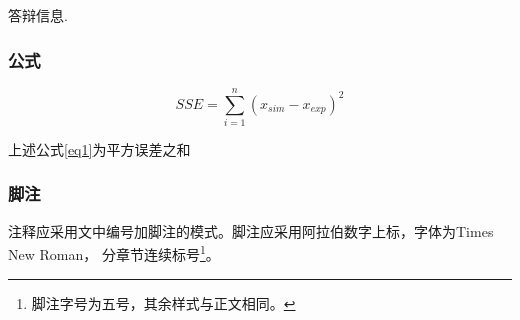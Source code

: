 \begin{center}
    \begin{table}[!htp]
        \vspace{-2em}
        \caption{答辩信息.}
        \vspace{-1.5em}
        \addtocounter{table}{-1}
        \renewcommand{\tablename}{Table.}    
        \caption{the title of the Table.} 
        \vspace*{-1em}
        \song{}
    \end{table}  
\end{center}

\newpage

\subsubsection{公式}

\begin{equation}
    SSE=\sum^{n}_{i=1}(x_{sim}-x_{exp})^2 \label{eq1}
\end{equation}

上述公式\ref{eq1}为平方误差之和

\subsubsection{脚注}

注释应采用文中编号加脚注的模式。脚注应采用阿拉伯数字上标，字体为Times New Roman，
分章节连续标号\footnote{脚注字号为五号，其余样式与正文相同。}。
